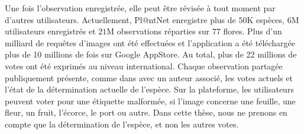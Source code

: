 Une fois l'observation enregistrée, elle peut être révisée à tout moment par d'autres utilisateurs.
Actuellement, Pl@ntNet enregistre plus de $50$K espèces, $6$M utilisateurs enregistrés et $21$M observations réparties sur $77$ flores.
Plus d'un milliard de requêtes d'images ont été effectuées et l'application a été téléchargée plus de 10 millions de fois sur Google AppStore.
Au total, plus de 22 millions de votes ont été exprimés au niveau international.
Chaque observation partagée publiquement présente, comme dans  avec un auteur associé, les votes actuels et l'état de la détermination actuelle de l'espèce.
Sur la plateforme, les utilisateurs peuvent voter pour une étiquette malformée, si l'image concerne une feuille, une fleur, un fruit, l'écorce, le port ou autre. Dans cette thèse, nous ne prenons en compte que la détermination de l'espèce, et non les autres votes.

